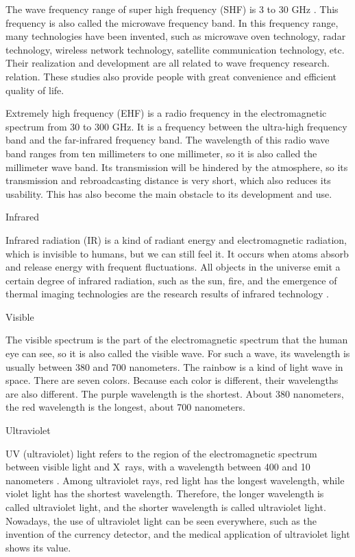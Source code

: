 \documentclass[conference]{IEEEtran}
\newcommand{\subparagraph}{}
\begin{document}
The wave frequency range of super high frequency (SHF) is 3 to 30 GHz \cite{Superhig8:online}. This frequency is also called the microwave frequency band. In this frequency range, many technologies have been invented, such as microwave oven technology, radar technology, wireless network technology, satellite communication technology, etc. Their realization and development are all related to wave frequency research. relation. These studies also provide people with great convenience and efficient quality of life.
    
Extremely high frequency (EHF) is a radio frequency in the electromagnetic spectrum from 30 to 300 GHz. It is a frequency between the ultra-high frequency band and the far-infrared frequency band. The wavelength of this radio wave band ranges from ten millimeters to one millimeter, so it is also called the millimeter wave band\cite{Extremel31:online}. Its transmission will be hindered by the atmosphere, so its transmission and rebroadcasting distance is very short, which also reduces its usability. This has also become the main obstacle to its development and use.

\subparagraph{Infrared}
    
Infrared radiation (IR) is a kind of radiant energy and electromagnetic radiation, which is invisible to humans, but we can 
still feel it. It occurs when atoms absorb and release energy with frequent fluctuations. All objects in the universe emit a 
certain degree of infrared radiation, such as the sun, fire, and the emergence of thermal imaging technologies are the research 
results of infrared technology \cite{L40416:online}.

\subparagraph{Visible}
    
The visible spectrum is the part of the electromagnetic spectrum that the human eye can see, so it is also called the visible wave. For such a wave, its wavelength is usually between 380 and 700 nanometers. The rainbow is a kind of light wave in space. There are seven colors. Because each color is different, their wavelengths are also different. The purple wavelength is the shortest. About 380 nanometers, the red wavelength is the longest, about 700 nanometers\cite{Vis73:online}.
 
\subparagraph{Ultraviolet}
    
UV (ultraviolet) light refers to the region of the electromagnetic spectrum between visible light and X\ rays, with a wavelength between 400 and 10 nanometers \cite{uvlight14:online}. Among ultraviolet rays, red light has the longest wavelength, while violet light has the shortest wavelength. Therefore, the longer wavelength is called ultraviolet light, and the shorter wavelength is called ultraviolet light. Nowadays, the use of ultraviolet light can be seen everywhere, such as the invention of the currency detector, and the medical application of ultraviolet light shows its value.
\end{document}
